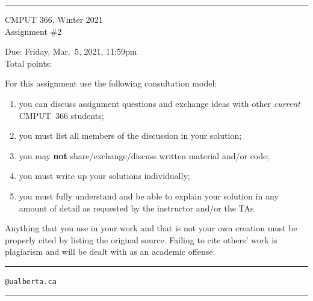 \documentclass{article}
\newcounter{totalpoints}
\begin{document}
{\bigskip\hrule\bigskip
\huge
\noindent CMPUT 366, Winter 2021\\
Assignment \#2

\large
Due: Friday, Mar.\ 5, 2021, 11:59pm\\
Total points: 

For this assignment use the following consultation model:
\begin{enumerate}

\item you can discuss assignment questions and exchange ideas with other \emph{current} CMPUT~366 students;

\item you must list all members of the discussion in your solution;

\item you may {\bf not} share/exchange/discuss written material and/or code;

\item you must write up your solutions individually;

\item you must fully understand and be able to explain your solution in any amount of detail as requested by the instructor and/or the TAs.

\end{enumerate}

Anything that you use in your work and that is not your own creation must be properly cited by listing the original source. Failing to cite others' work is plagiarism and will be dealt with as an academic offense.


\bigskip\bigskip\hrule\bigskip

\vspace{1cm}
\hspace{1cm}{\bf First name:} \underline{\hspace{7cm}}

\vspace{1cm}
\hspace{1cm}{\bf Last name:} \underline{\hspace{7cm}}

\vspace{1cm}
\hspace{1cm}{\bf CCID:} \underline{\hspace{5.5cm}}\verb|@ualberta.ca|

\vspace{1cm}
\hspace{1cm}{\bf Collaborators:} \underline{\hspace{6.5cm}}

\vspace{1cm}
\bigskip\hrule\bigskip
}
\end{document}
